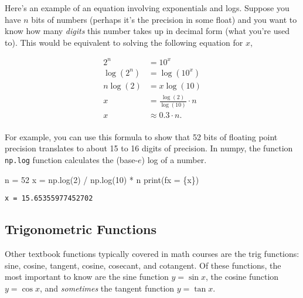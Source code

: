 \documentclass[
  letterpaper,
  DIV=11,
  numbers=noendperiod]{scrreprt}
\newenvironment{Shaded}{\begin{snugshade}}{\end{snugshade}}
\newcommand{\BuiltInTok}[1]{\textcolor[rgb]{0.00,0.23,0.31}{#1}}
\newcommand{\DecValTok}[1]{\textcolor[rgb]{0.68,0.00,0.00}{#1}}
\newcommand{\NormalTok}[1]{\textcolor[rgb]{0.00,0.23,0.31}{#1}}
\newcommand{\OperatorTok}[1]{\textcolor[rgb]{0.37,0.37,0.37}{#1}}
\newcommand{\SpecialCharTok}[1]{\textcolor[rgb]{0.37,0.37,0.37}{#1}}
\newcommand{\SpecialStringTok}[1]{\textcolor[rgb]{0.13,0.47,0.30}{#1}}
\begin{document}
Here's an example of an equation involving exponentials and logs.
Suppose you have \(n\) bits of numbers (perhaps it's the precision in
some float) and you want to know how many \emph{digits} this number
takes up in decimal form (what you're used to). This would be equivalent
to solving the following equation for \(x\),

\begin{align*}
2^n &= 10^{x} \\
\log(2^n) &= \log(10^{x}) \\
n\log(2) &= x\log(10) \\
x &= \frac{\log(2)}{\log(10)} \cdot n \\
x &\approx 0.3 \cdot n. \\
\end{align*}

For example, you can use this formula to show that 52 bits of floating
point precision translates to about 15 to 16 digits of precision. In
numpy, the function \texttt{np.log} function calculates the (base-\(e\))
log of a number.

\begin{Shaded}
\begin{Highlighting}[]
\NormalTok{n }\OperatorTok{=} \DecValTok{52}
\NormalTok{x }\OperatorTok{=}\NormalTok{ np.log(}\DecValTok{2}\NormalTok{) }\OperatorTok{/}\NormalTok{ np.log(}\DecValTok{10}\NormalTok{) }\OperatorTok{*}\NormalTok{ n}
\BuiltInTok{print}\NormalTok{(}\SpecialStringTok{f\textquotesingle{}x = }\SpecialCharTok{\{}\NormalTok{x}\SpecialCharTok{\}}\SpecialStringTok{\textquotesingle{}}\NormalTok{)}
\end{Highlighting}
\end{Shaded}

\begin{verbatim}
x = 15.65355977452702
\end{verbatim}

\hypertarget{trigonometric-functions}{%
\subsection{Trigonometric Functions}\label{trigonometric-functions}}

Other textbook functions typically covered in math courses are the trig
functions: sine, cosine, tangent, cosine, cosecant, and cotangent. Of
these functions, the most important to know are the sine function
\(y=\sin x\), the cosine function \(y = \cos x\), and \emph{sometimes}
the tangent function \(y = \tan x\).
\end{document}
